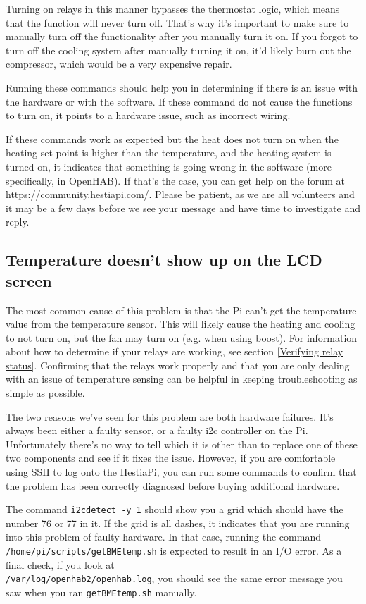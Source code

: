 Turning on relays in this manner bypasses the thermostat logic, which means
that the function will never turn off. That's why it's important to make sure
to manually turn off the functionality after you manually turn it on. If you
forgot to turn off the cooling system after manually turning it on, it'd likely
burn out the compressor, which would be a very expensive repair.

Running these commands should help you in determining if there is an issue with
the hardware or with the software. If these command do not cause the functions
to turn on, it points to a hardware issue, such as incorrect wiring.

If these commands work as expected but the heat does not turn on when the
heating set point is higher than the temperature, and the heating system is
turned on, it indicates that something is going wrong in the software (more
specifically, in OpenHAB). If that's the case, you can get help on the forum
at \url{https://community.hestiapi.com/}. Please be patient, as we are all
volunteers and it may be a few days before we see your message and have time to
investigate and reply.

\subsection{Temperature doesn't show up on the LCD screen}
The most common cause of this problem is that the Pi can't get the temperature
value from the temperature sensor. This will likely cause the heating and
cooling to not turn on, but the fan may turn on (e.g. when using boost). For
information about how to determine if your relays are working, see section
\ref{Verifying relay status}. Confirming that the relays work properly and that
you are only dealing with an issue of temperature sensing can be helpful in
keeping troubleshooting as simple as possible.

The two reasons we've seen for this problem are both hardware failures. It's
always been either a faulty sensor, or a faulty i2c controller on the Pi.
Unfortunately there's no way to tell which it is other than to replace one of
these two components and see if it fixes the issue. However, if you are
comfortable using SSH to log onto the HestiaPi, you can run some commands to
confirm that the problem has been correctly diagnosed before buying additional
hardware.

The command \texttt{i2cdetect -y 1} should show you a grid which should have
the number 76 or 77 in it. If the grid is all dashes, it indicates that you are
running into this problem of faulty hardware. In that case, running the command
\texttt{/home/pi/scripts/getBMEtemp.sh} is expected to result in an I/O error.
As a final check, if you look at\\
\texttt{/var/log/openhab2/openhab.log}, you should see the same error message
you saw when you ran \texttt{getBMEtemp.sh} manually.

